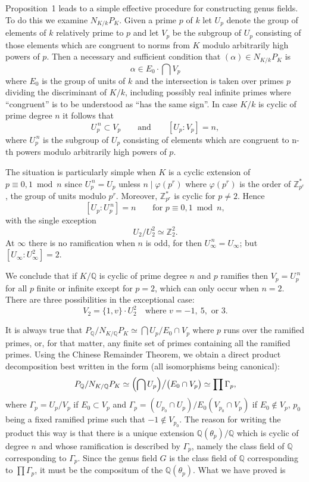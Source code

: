 Proposition~1 leads to a simple effective procedure for constructing
genus fields. To do this we examine $N_{K/k}P_{K}$. Given a prime $p$ of
$k$ let $U_{p}$ denote the group of elements of $k$ relatively prime to
$p$ and let $V_{p}$ be the subgroup of $U_{p}$ consisting of those
elements which are congruent to norms from $K$ modulo arbitrarily high
powers of $p$. Then a necessary and sufficient condition that
$(\alpha)\in N_{K/k}P_{K}$ is
\[
\alpha\in E_{0}\cdot\bigcap V_{p}
\]
where $E_{0}$ is the group of units of $k$ and the intersection is taken
over primes $p$ dividing the discriminant of $K/k$, including possibly
real infinite primes where ``congruent'' is to be understood as ``has the
same sign''. In case $K/k$ is cyclic of prime degree $n$ it follows that
\[
U_{p}^{\,n}\subset V_{p}\qquad\text{and}\qquad[U_{p}:V_{p}]=n,
\]
where $U_{p}^{\,n}$ is the subgroup of $U_{p}$ consisting of elements
which are congruent to n-th powers modulo arbitrarily high powers of $p$.

The situation is particularly simple when $K$ is a cyclic extension of
$p\equiv 0,1\bmod n$ since $U_{p}^{\,n}=U_{p}$ unless $n\mid\varphi(p^{r})$
where $\varphi(p^{r})$ is the order of $\mathbb{Z}_{p^{r}}^{*}$, the
group of units modulo $p^{r}$. Moreover, $\mathbb{Z}_{p^{r}}^{*}$ is
cyclic for $p\neq 2$. Hence
\[
[U_{p}:U_{p}^{\,n}]=n\qquad\text{for }p\equiv 0,1\bmod n,
\]
with the single exception
\[
U_{2}/U_{2}^{2}\simeq\mathbb{Z}_{2}^{2}.
\]
At $\infty$ there is no ramification when $n$ is odd, for then
$U_{\infty}^{\,n}=U_{\infty}$; but $[U_{\infty}:U_{\infty}^{2}]=2$.

We conclude that if $K/\mathbb{Q}$ is cyclic of prime degree $n$ and $p$
ramifies then $V_{p}=U_{p}^{\,n}$ for all $p$ finite or infinite except
for $p=2$, which can only occur when $n=2$. There are three possibilities
in the exceptional case:
\[
V_{2}=\{1,v\}\cdot U_{2}^{2}\quad\text{where }v=-1,\ 5,\text{ or }3.
\]

It is always true that $P_{\mathbb{Q}}/N_{K/\mathbb{Q}}P_{K}
\simeq\bigcap U_{p}/E_{0}\cap V_{p}$ where $p$ runs over the ramified
primes, or, for that matter, any finite set of primes containing all the
ramified primes. Using the Chinese Remainder Theorem, we obtain a direct
product decomposition best written in the form (all isomorphisms being
canonical):
\[
P_{\mathbb{Q}}/N_{K/\mathbb{Q}}P_{K}
\simeq\Bigl(\bigcap U_{p}\Bigr)\big/\bigl(E_{0}\cap V_{p}\bigr)
\simeq\prod\Gamma_{p},
\]
where $\Gamma_{p}=U_{p}/V_{p}$ if $E_{0}\subset V_{p}$ and
$\Gamma_{p}=(U_{p_{0}}\cap U_{p})/E_{0}(V_{p_{0}}\cap V_{p})$ if
$E_{0}\notin V_{p}$, $p_{0}$ being a fixed ramified prime such that
$-1\notin V_{p_{0}}$. The reason for writing the product this way is that
there is a unique extension $\mathbb{Q}(\theta_{p})/\mathbb{Q}$ which is
cyclic of degree $n$ and whose ramification is described by $\Gamma_{p}$,
namely the class field of $\mathbb{Q}$ corresponding to $\Gamma_{p}$.
Since the genus field $G$ is the class field of $\mathbb{Q}$
corresponding to $\prod\Gamma_{p}$, it must be the compositum of the
$\mathbb{Q}(\theta_{p})$. What we have proved is

